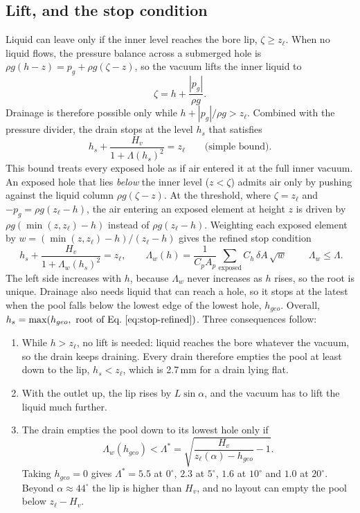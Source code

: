 \documentclass[10pt,a4paper]{article}
\newcommand{\Lw}{\Lambda_{w}}
\newcommand{\zl}{z_\ell}
\begin{document}
\subsection{Lift, and the stop condition}
Liquid can leave only if the inner level reaches the bore lip, $\zeta\ge\zl$. When no liquid flows, the pressure balance across a submerged hole is $\rho g(h-z)=p_g+\rho g(\zeta-z)$, so the vacuum lifts the inner liquid to
\begin{equation}
\zeta = h + \frac{|p_g|}{\rho g}.
\end{equation}
Drainage is therefore possible only while $h+|p_g|/\rho g>\zl$. Combined with the pressure divider, the drain stops at the level $h_s$ that satisfies
\begin{equation}
h_s + \frac{H_v}{1+\Lambda(h_s)^2} = \zl \qquad\text{(simple bound).}
\label{eq:stop-simple}
\end{equation}
This bound treats every exposed hole as if air entered it at the full inner vacuum. An exposed hole that lies \emph{below} the inner level ($z<\zeta$) admits air only by pushing against the liquid column $\rho g(\zeta-z)$. At the threshold, where $\zeta=\zl$ and $-p_g=\rho g(\zl-h)$, the air entering an exposed element at height $z$ is driven by $\rho g(\min(z,\zl)-h)$ instead of $\rho g(\zl-h)$. Weighting each exposed element by $w=(\min(z,\zl)-h)/(\zl-h)$ gives the refined stop condition
\begin{equation}
\boxed{\;h_s + \frac{H_v}{1+\Lw(h_s)^2} = \zl,\qquad
\Lw(h)=\frac{1}{C_pA_p}\sum_{\text{exposed}} C_h\,\delta A\,\sqrt{w}\;}
\qquad\Lw\le\Lambda.
\label{eq:stop-refined}
\end{equation}
The left side increases with $h$, because $\Lw$ never increases as $h$ rises, so the root is unique. Drainage also needs liquid that can reach a hole, so it stops at the latest when the pool falls below the lowest edge of the lowest hole, $h_{geo}$. Overall, $h_s=\max(h_{geo},\ \text{root of Eq.~\eqref{eq:stop-refined}})$. Three consequences follow:
\begin{enumerate}
\item While $h>\zl$, no lift is needed: liquid reaches the bore whatever the vacuum, so the drain keeps draining. Every drain therefore empties the pool at least down to the lip, $h_s<\zl$, which is 2.7\,mm for a drain lying flat.
\item With the outlet up, the lip rises by $L\sin\alpha$, and the vacuum has to lift the liquid much further.
\item The drain empties the pool down to its lowest hole only if
\begin{equation}
\Lw(h_{geo}) < \Lambda^* = \sqrt{\frac{H_v}{\zl(\alpha)-h_{geo}}-1}.
\label{eq:lstar}
\end{equation}
Taking $h_{geo}=0$ gives $\Lambda^*=5.5$ at $0^\circ$, $2.3$ at $5^\circ$, $1.6$ at $10^\circ$ and $1.0$ at $20^\circ$. Beyond $\alpha\approx44^\circ$ the lip is higher than $H_v$, and no layout can empty the pool below $\zl-H_v$.
\end{enumerate}
\end{document}
